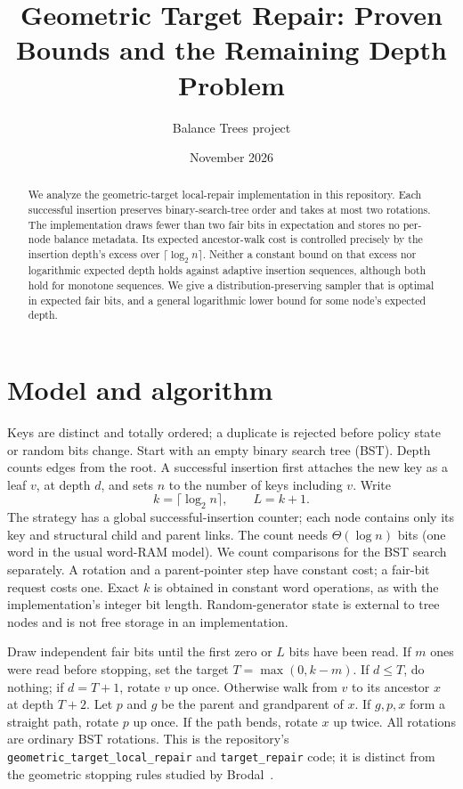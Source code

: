 \documentclass[11pt]{article}
\title{Geometric Target Repair: Proven Bounds and the Remaining Depth Problem}
\author{Balance Trees project}
\date{November 2026}
\begin{document}
\maketitle
\begin{abstract}
We analyze the geometric-target local-repair implementation in this repository.
Each successful insertion preserves binary-search-tree order and takes at most two
rotations. The implementation draws fewer than two fair bits in expectation and
stores no per-node balance metadata. Its expected ancestor-walk cost is controlled
precisely by the insertion depth's excess over $\lceil\log_2 n\rceil$. Neither a
constant bound on that excess nor logarithmic expected depth holds against
adaptive insertion sequences, although both hold for monotone sequences.
We give a distribution-preserving sampler that is optimal in expected fair bits,
and a general logarithmic lower bound for some node's expected depth.
\end{abstract}

\section{Model and algorithm}
Keys are distinct and totally ordered; a duplicate is rejected before policy
state or random bits change. Start with an empty binary search tree (BST).
Depth counts edges from the root. A successful insertion first attaches the new
key as a leaf $v$, at depth $d$, and sets $n$ to the number of keys including
$v$. Write
\[ k=\lceil\log_2 n\rceil,\qquad L=k+1. \]
The strategy has a global successful-insertion counter; each node contains only
its key and structural child and parent links. The count needs $\Theta(\log n)$
bits (one word in the usual word-RAM model). We count comparisons for the BST
search separately. A rotation and a parent-pointer step have constant cost; a
fair-bit request costs one. Exact $k$ is obtained in constant word operations,
as with the implementation's integer bit length. Random-generator state is
external to tree nodes and is not free storage in an implementation.

Draw independent fair bits until the first zero or $L$ bits have been read. If
$m$ ones were read before stopping, set the target $T=\max(0,k-m)$. If $d\leq T$,
do nothing; if $d=T+1$, rotate $v$ up once. Otherwise walk from $v$ to its
ancestor $x$ at depth $T+2$. Let $p$ and $g$ be the parent and grandparent of
$x$. If $g,p,x$ form a straight path, rotate $p$ up once. If the path bends,
rotate $x$ up twice. All rotations are ordinary BST rotations. This is the
repository's \texttt{geometric\_target\_local\_repair} and
\texttt{target\_repair} code; it is distinct from the geometric stopping rules
studied by Brodal~\cite{brodal}.
\end{document}
